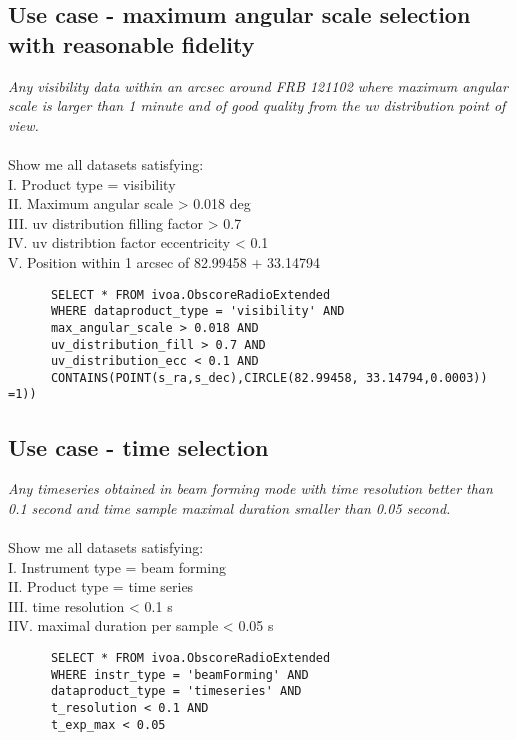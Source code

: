 \subsection{Use case - maximum angular scale selection with reasonable fidelity}
\textit{Any visibility data within an arcsec around FRB 121102 where  maximum angular scale is larger than 1 minute  and 
of good quality from the uv distribution point of view.}\\ \\
Show me all datasets satisfying:\\
I. Product type = visibility \\
II. Maximum angular scale  >  0.018 deg \\
III. uv distribution filling factor  > 0.7 \\
IV. uv distribtion factor eccentricity  < 0.1 \\
V. Position within 1 arcsec of 82.99458 + 33.14794
\begin{verbatim}
      SELECT * FROM ivoa.ObscoreRadioExtended
      WHERE dataproduct_type = 'visibility' AND
      max_angular_scale > 0.018 AND
      uv_distribution_fill > 0.7 AND
      uv_distribution_ecc < 0.1 AND 
      CONTAINS(POINT(s_ra,s_dec),CIRCLE(82.99458, 33.14794,0.0003)) =1))
\end{verbatim}

\subsection{Use case -  time selection }
\textit{Any timeseries obtained in beam forming mode with time resolution better than 0.1 second and time sample maximal duration smaller than 0.05 second. }\\ \\
Show me all datasets satisfying:\\
I. Instrument type = beam forming\\
II. Product type = time series  \\
III. time resolution < 0.1 s\\
IIV. maximal duration per sample  < 0.05 s \\

\begin{verbatim}
      SELECT * FROM ivoa.ObscoreRadioExtended
      WHERE instr_type = 'beamForming' AND
      dataproduct_type = 'timeseries' AND
      t_resolution < 0.1 AND
      t_exp_max < 0.05 
\end{verbatim}
